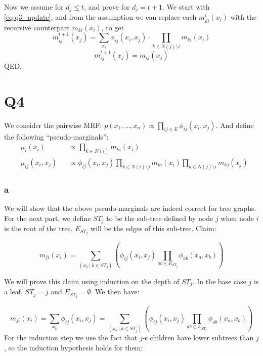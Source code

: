 \documentclass[11pt]{article}
\begin{document}
Now we assume for $d_j \le t$, and prove for $d_j = t+1$.
We start with \eqref{eq:q3_update}, and from the assumption we can replace each 
$m_{ki}^t\left(x_i\right)$ with the recursive counterpart $m_{ki}\left(x_i\right)$, to get
\begin{equation*}
m_{ij}^{t+1}\left(x_j\right)=\sum_{x_i} \phi_{ij}\left(x_i, x_j\right) \cdot \prod_{k\in N\left(j\right)\setminus i} m_{ki}\left(x_i\right)
\end{equation*}
\begin{equation*}
m_{ij}^{t+1}\left(x_j\right)=m_{ij}\left(x_j\right)
\end{equation*}
QED.

\part*{Q4}

We consider the pairwise MRF:
$p(x_1,\ldots,x_n) \propto \prod_{ij \in E} \phi_{ij}(x_i,x_j)$.
And define the following ``pseudo-marginals'':
\begin{align}
&\mu_{i}(x_i) &&\propto \prod_{k \in N(i)} m_{ki}(x_i) \\
&\mu_{ij}(x_i, x_j) &&\propto \phi_{ij}(x_i,x_j) \prod_{k \in N(i) \setminus j} m_{ki}(x_i) \prod_{k \in N(j) \setminus i} m_{kj}(x_j)
\end{align}

\section*{a}

We will show that the above pseudo-marginals are indeed correct for tree graphs.
For the next part, we define $ST_j$ to be the sub-tree defined by node $j$ when node $i$ is the root of the tree. $E_{ST_j}$ will be the edges of this sub-tree. Claim:

\begin{equation}
m_{ji}(x_i) = \sum_{(x_k\ |\ k \in ST_j)} \left( \phi_{ij}(x_i,x_j) \prod_{ab \in E_{ST_j}} \phi_{ab}(x_a,x_b) \right)
\end{equation}

We will prove this claim using induction on the depth of $ST_j$. In the base case $j$ is a leaf, $ST_j = {j}$ and $E_{ST_j} = \emptyset$. We then have:

\begin{equation}
m_{ji}(x_i) = \sum_{x_k} \phi_{ij}(x_i,x_j) = \sum_{(x_k\ |\ k \in ST_j)} \left( \phi_{ij}(x_i,x_j) \prod_{ab \in E_{ST_j}} \phi_{ab}(x_a,x_b) \right)
\end{equation}
For the induction step we use the fact that $j$-s children have lower subtrees than $j$,
so the induction hypothesis holds for them:
\end{document}
